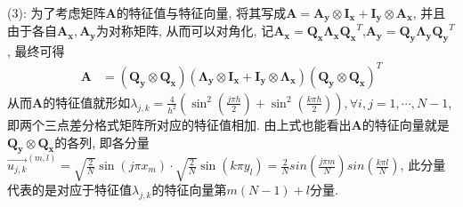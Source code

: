 \documentclass[12pt]{article}
\begin{document}
\quad \\
(3): 为了考虑矩阵$\boldsymbol{A}$的特征值与特征向量, 将其写成$\boldsymbol{A=A_y\otimes I_x+I_y \otimes A_x}$, 并且由于各自$\boldsymbol{A_x},\boldsymbol{A_y}$为对称矩阵, 从而可以对角化, 记$\boldsymbol{A_x}=\boldsymbol{Q_x\Lambda_xQ_x}^T$,$\boldsymbol{A_y}=\boldsymbol{Q_y\Lambda_yQ_y}^T$, 最终可得
\begin{align*}
	\boldsymbol{A}&=(\boldsymbol{Q_y\otimes Q_x})(\boldsymbol{\Lambda_y \otimes I_x}+\boldsymbol{I_y \otimes \Lambda_x})(\boldsymbol{Q_y\otimes Q_x})^T
\end{align*}
\noindent 从而$\boldsymbol{A}$的特征值就形如$\lambda_{j,k}=\frac{4}{h^2}(\sin^2(\frac{j \pi h}{2})+\sin^2(\frac{k\pi h}{2})),\forall i,j=1,\cdots,N-1$, 即两个三点差分格式矩阵所对应的特征值相加. 由上式也能看出$\boldsymbol{A}$的特征向量就是$\boldsymbol{Q_y \otimes Q_x}$的各列, 即各分量$\overset{\rightarrow}{u_{j,k}}^{(m,l)}=\sqrt{\frac{2}{N}}\sin(j\pi x_m)\cdot \sqrt{\frac{2}{N}}\sin(k\pi y_l)=\frac{2}{N}sin(\frac{j \pi m}{N})sin(\frac{k \pi l}{N})$, 此分量代表的是对应于特征值$\lambda_{j,k}$的特征向量第$m(N-1)+l$分量.
\end{document}

